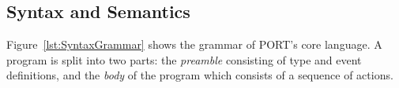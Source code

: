 %
%
%
%
%
%


\subsection{Syntax and Semantics}
\label{sub:SyntaxAndSemantics}

Figure~\ref{lst:SyntaxGrammar} shows the grammar of PORT's core language.
A program is split into two parts: the \emph{preamble} consisting of type and event definitions, and the \emph{body} of the program which consists of a sequence of actions. 


